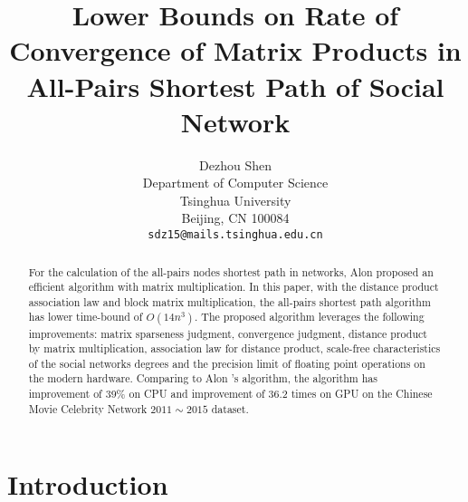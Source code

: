 \documentclass[10pt,twocolumn,letterpaper]{article}
\begin{document}
\title{Lower Bounds on Rate of Convergence of Matrix Products in All-Pairs Shortest Path of Social Network}

\author{Dezhou Shen\\
Department of Computer Science\\
Tsinghua University\\
Beijing, CN 100084\\
{\tt\small sdz15@mails.tsinghua.edu.cn}
}

\maketitle
\ificcvfinal\thispagestyle{empty}\fi

\begin{abstract}

  For the calculation of the all-pairs nodes shortest path in networks,
  Alon \etal proposed an efficient algorithm with matrix multiplication.
  In this paper, with the distance product association law and block matrix multiplication,
  the all-pairs shortest path algorithm has lower time-bound of $O(14n^3)$.
  The proposed algorithm leverages the following improvements:
  matrix sparseness judgment, convergence judgment, distance product by matrix multiplication, association law for distance product,
  scale-free characteristics of the social networks degrees and the precision limit of floating point operations on the modern hardware.
  Comparing to Alon \etal's algorithm, the algorithm has improvement of 39\% on CPU and improvement of 36.2 times on GPU
  on the Chinese Movie Celebrity Network $2011\sim2015$ dataset.

\end{abstract}


\section{Introduction}
\end{document}
